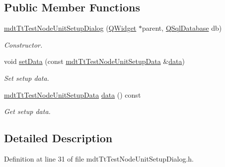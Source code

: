 \subsection*{Public Member Functions}
\begin{DoxyCompactItemize}
\item 
\hyperlink{classmdt_tt_test_node_unit_setup_dialog_a3203a81f1f6d6cbea4f36e0c67471a4c}{mdt\-Tt\-Test\-Node\-Unit\-Setup\-Dialog} (\hyperlink{class_q_widget}{Q\-Widget} $\ast$parent, \hyperlink{class_q_sql_database}{Q\-Sql\-Database} db)
\begin{DoxyCompactList}\small\item\em Constructor. \end{DoxyCompactList}\item 
void \hyperlink{classmdt_tt_test_node_unit_setup_dialog_a136ff71aa96193408318c285ed674017}{set\-Data} (const \hyperlink{classmdt_tt_test_node_unit_setup_data}{mdt\-Tt\-Test\-Node\-Unit\-Setup\-Data} \&\hyperlink{classmdt_tt_test_node_unit_setup_dialog_a9533f72e17e88d434320c298ecd99f11}{data})
\begin{DoxyCompactList}\small\item\em Set setup data. \end{DoxyCompactList}\item 
\hyperlink{classmdt_tt_test_node_unit_setup_data}{mdt\-Tt\-Test\-Node\-Unit\-Setup\-Data} \hyperlink{classmdt_tt_test_node_unit_setup_dialog_a9533f72e17e88d434320c298ecd99f11}{data} () const 
\begin{DoxyCompactList}\small\item\em Get setup data. \end{DoxyCompactList}\end{DoxyCompactItemize}


\subsection{Detailed Description}


Definition at line 31 of file mdt\-Tt\-Test\-Node\-Unit\-Setup\-Dialog.\-h.



